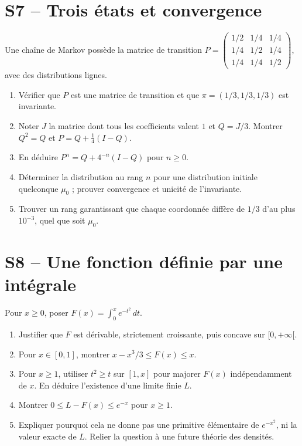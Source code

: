 \section{S7 -- Trois états et convergence}
Une chaîne de Markov possède la matrice de transition
$P=\begin{pmatrix}1/2&1/4&1/4\\1/4&1/2&1/4\\1/4&1/4&1/2\end{pmatrix}$, avec des distributions lignes.
\begin{enumerate}
\item Vérifier que $P$ est une matrice de transition et que $\pi=(1/3,1/3,1/3)$ est invariante.
\item Noter $J$ la matrice dont tous les coefficients valent $1$ et $Q=J/3$. Montrer $Q^2=Q$ et $P=Q+\tfrac14(I-Q)$.
\item En déduire $P^n=Q+4^{-n}(I-Q)$ pour $n\ge0$.
\item Déterminer la distribution au rang $n$ pour une distribution initiale quelconque $\mu_0$ ; prouver convergence et unicité de l'invariante.
\item Trouver un rang garantissant que chaque coordonnée diffère de $1/3$ d'au plus $10^{-3}$, quel que soit $\mu_0$.
\end{enumerate}

\section{S8 -- Une fonction définie par une intégrale}
Pour $x\ge0$, poser $F(x)=\int_0^xe^{-t^2}\,dt$.
\begin{enumerate}
\item Justifier que $F$ est dérivable, strictement croissante, puis concave sur $[0,+\infty[$.
\item Pour $x\in[0,1]$, montrer $x-x^3/3\le F(x)\le x$.
\item Pour $x\ge1$, utiliser $t^2\ge t$ sur $[1,x]$ pour majorer $F(x)$ indépendamment de $x$. En déduire l'existence d'une limite finie $L$.
\item Montrer $0\le L-F(x)\le e^{-x}$ pour $x\ge1$.
\item Expliquer pourquoi cela ne donne pas une primitive élémentaire de $e^{-x^2}$, ni la valeur exacte de $L$. Relier la question à une future théorie des densités.
\end{enumerate}
